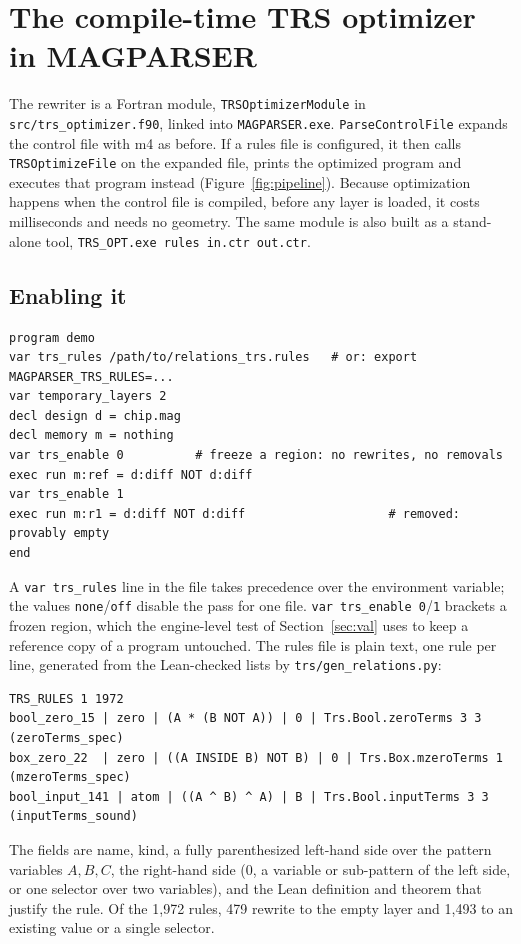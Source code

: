 \documentclass[11pt]{article}
\begin{document}
\section{The compile-time TRS optimizer in MAGPARSER}\label{sec:trs}
The rewriter is a Fortran module, \texttt{TRSOptimizerModule} in \texttt{src/trs\_optimizer.f90}, linked into \texttt{MAGPARSER.exe}. \texttt{ParseControlFile} expands the control file with m4 as before. If a rules file is configured, it then calls \texttt{TRSOptimizeFile} on the expanded file, prints the optimized program and executes that program instead (Figure~\ref{fig:pipeline}). Because optimization happens when the control file is compiled, before any layer is loaded, it costs milliseconds and needs no geometry. The same module is also built as a stand-alone tool, \texttt{TRS\_OPT.exe rules in.ctr out.ctr}.

\subsection{Enabling it}
\begin{lstlisting}[language=CTR]
program demo
var trs_rules /path/to/relations_trs.rules   # or: export MAGPARSER_TRS_RULES=...
var temporary_layers 2
decl design d = chip.mag
decl memory m = nothing
var trs_enable 0          # freeze a region: no rewrites, no removals
exec run m:ref = d:diff NOT d:diff
var trs_enable 1
exec run m:r1 = d:diff NOT d:diff                    # removed: provably empty
end
\end{lstlisting}
A \texttt{var trs\_rules} line in the file takes precedence over the environment variable; the values \texttt{none}/\texttt{off} disable the pass for one file. \texttt{var trs\_enable 0}/\texttt{1} brackets a frozen region, which the engine-level test of Section~\ref{sec:val} uses to keep a reference copy of a program untouched. The rules file is plain text, one rule per line, generated from the Lean-checked lists by \texttt{trs/gen\_relations.py}:
\begin{lstlisting}
TRS_RULES 1 1972
bool_zero_15 | zero | (A * (B NOT A)) | 0 | Trs.Bool.zeroTerms 3 3 (zeroTerms_spec)
box_zero_22  | zero | ((A INSIDE B) NOT B) | 0 | Trs.Box.mzeroTerms 1 (mzeroTerms_spec)
bool_input_141 | atom | ((A ^ B) ^ A) | B | Trs.Bool.inputTerms 3 3 (inputTerms_sound)
\end{lstlisting}
The fields are name, kind, a fully parenthesized left-hand side over the pattern variables $A,B,C$, the right-hand side ($0$, a variable or sub-pattern of the left side, or one selector over two variables), and the Lean definition and theorem that justify the rule. Of the 1{,}972 rules, 479 rewrite to the empty layer and 1{,}493 to an existing value or a single selector.
\end{document}
